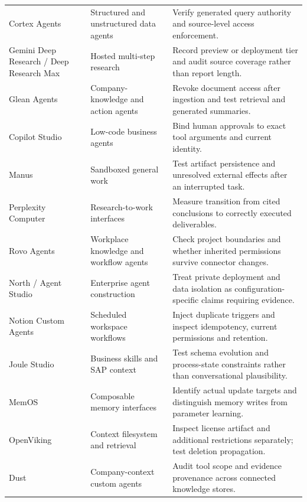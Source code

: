 \begin{longtable}{L{25mm}L{35mm}L{48mm}}
Cortex Agents\cite{executionproduct059} & Structured and unstructured data agents & Verify generated query authority and source-level access enforcement. \\
Gemini Deep Research / Deep Research Max\cite{executionproduct063} & Hosted multi-step research & Record preview or deployment tier and audit source coverage rather than report length. \\
Glean Agents\cite{executionproduct064} & Company-knowledge and action agents & Revoke document access after ingestion and test retrieval and generated summaries. \\
Copilot Studio\cite{executionproduct072} & Low-code business agents & Bind human approvals to exact tool arguments and current identity. \\
Manus\cite{executionproduct076} & Sandboxed general work & Test artifact persistence and unresolved external effects after an interrupted task. \\
Perplexity Computer\cite{executionproduct077} & Research-to-work interfaces & Measure transition from cited conclusions to correctly executed deliverables. \\
Rovo Agents\cite{executionproduct078} & Workplace knowledge and workflow agents & Check project boundaries and whether inherited permissions survive connector changes. \\
North / Agent Studio\cite{executionproduct079} & Enterprise agent construction & Treat private deployment and data isolation as configuration-specific claims requiring evidence. \\
Notion Custom Agents\cite{executionproduct080} & Scheduled workspace workflows & Inject duplicate triggers and inspect idempotency, current permissions and retention. \\
Joule Studio\cite{executionproduct081} & Business skills and SAP context & Test schema evolution and process-state constraints rather than conversational plausibility. \\
MemOS\cite{executionproduct083} & Composable memory interfaces & Identify actual update targets and distinguish memory writes from parameter learning. \\
OpenViking\cite{executionproduct084} & Context filesystem and retrieval & Inspect license artifact and additional restrictions separately; test deletion propagation. \\
Dust\cite{executionproduct085} & Company-context custom agents & Audit tool scope and evidence provenance across connected knowledge stores. \\

\end{longtable}
